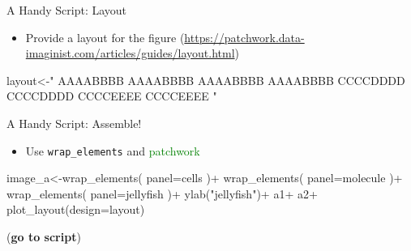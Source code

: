 \documentclass[
  ignorenonframetext,
]{beamer}
\newenvironment{Shaded}{\begin{snugshade}}{\end{snugshade}}
\newcommand{\AttributeTok}[1]{\textcolor[rgb]{0.40,0.45,0.13}{#1}}
\newcommand{\FunctionTok}[1]{\textcolor[rgb]{0.28,0.35,0.67}{#1}}
\newcommand{\NormalTok}[1]{\textcolor[rgb]{0.00,0.23,0.31}{#1}}
\newcommand{\OtherTok}[1]{\textcolor[rgb]{0.00,0.23,0.31}{#1}}
\newcommand{\SpecialCharTok}[1]{\textcolor[rgb]{0.37,0.37,0.37}{#1}}
\newcommand{\StringTok}[1]{\textcolor[rgb]{0.13,0.47,0.30}{#1}}
\providecommand{\tightlist}{%
  \setlength{\itemsep}{0pt}\setlength{\parskip}{0pt}}\usepackage{longtable,booktabs,array}
\begin{document}
\begin{frame}[fragile]{A Handy Script: Layout}
\protect\hypertarget{a-handy-script-layout}{}
\begin{itemize}[<+->]
\tightlist
\item
  Provide a layout for the figure
  (\url{https://patchwork.data-imaginist.com/articles/guides/layout.html})
\end{itemize}

\pause

\footnotesize

\begin{Shaded}
\begin{Highlighting}[]
\NormalTok{                        layout}\OtherTok{\textless{}{-}}\StringTok{"}
\StringTok{                        AAAABBBB}
\StringTok{                        AAAABBBB}
\StringTok{                        AAAABBBB}
\StringTok{                        AAAABBBB}
\StringTok{                        CCCCDDDD}
\StringTok{                        CCCCDDDD}
\StringTok{                        CCCCEEEE}
\StringTok{                        CCCCEEEE}
\StringTok{                        "}
\end{Highlighting}
\end{Shaded}
\end{frame}

\begin{frame}[fragile]{A Handy Script: Assemble!}
\protect\hypertarget{a-handy-script-assemble}{}
\begin{itemize}[<+->]
\tightlist
\item
  Use \texttt{wrap\_elements} and \textcolor{green}{{patchwork}}
\end{itemize}

\footnotesize

\begin{Shaded}
\begin{Highlighting}[]
\NormalTok{                image\_a}\OtherTok{\textless{}{-}}\FunctionTok{wrap\_elements}\NormalTok{(}
                    \AttributeTok{panel=}\NormalTok{cells}
\NormalTok{                )}\SpecialCharTok{+}
                    \FunctionTok{wrap\_elements}\NormalTok{(}
                        \AttributeTok{panel=}\NormalTok{molecule}
\NormalTok{                    )}\SpecialCharTok{+}
                    \FunctionTok{wrap\_elements}\NormalTok{(}
                        \AttributeTok{panel=}\NormalTok{jellyfish}
\NormalTok{                    )}\SpecialCharTok{+}
                    \FunctionTok{ylab}\NormalTok{(}\StringTok{"jellyfish"}\NormalTok{)}\SpecialCharTok{+}
\NormalTok{                    a1}\SpecialCharTok{+}
\NormalTok{                    a2}\SpecialCharTok{+}
                    \FunctionTok{plot\_layout}\NormalTok{(}\AttributeTok{design=}\NormalTok{layout)}
\end{Highlighting}
\end{Shaded}

\normalsize

(\textbf{go to script})
\end{frame}
\end{document}
